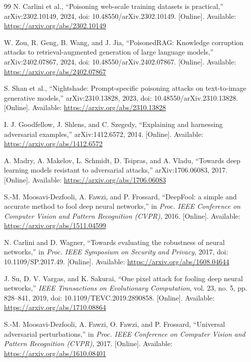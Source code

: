 \documentclass[conference]{IEEEtran}
\begin{document}
\begin{thebibliography}{99}
N. Carlini et al., ``Poisoning web-scale training datasets is practical,'' arXiv:2302.10149, 2024, doi: 10.48550/arXiv.2302.10149. [Online]. Available: \url{https://arxiv.org/abs/2302.10149}

W. Zou, R. Geng, B. Wang, and J. Jia, ``PoisonedRAG: Knowledge corruption attacks to retrieval-augmented generation of large language models,'' arXiv:2402.07867, 2024, doi: 10.48550/arXiv.2402.07867. [Online]. Available: \url{https://arxiv.org/abs/2402.07867}

S. Shan et al., ``Nightshade: Prompt-specific poisoning attacks on text-to-image generative models,'' arXiv:2310.13828, 2023, doi: 10.48550/arXiv.2310.13828. [Online]. Available: \url{https://arxiv.org/abs/2310.13828}

I. J. Goodfellow, J. Shlens, and C. Szegedy, ``Explaining and harnessing adversarial examples,'' arXiv:1412.6572, 2014. [Online]. Available: \url{https://arxiv.org/abs/1412.6572}

A. Madry, A. Makelov, L. Schmidt, D. Tsipras, and A. Vladu, ``Towards deep learning models resistant to adversarial attacks,'' arXiv:1706.06083, 2017. [Online]. Available: \url{https://arxiv.org/abs/1706.06083}

S.-M. Moosavi-Dezfooli, A. Fawzi, and P. Frossard, ``DeepFool: a simple and accurate method to fool deep neural networks,'' in \emph{Proc. IEEE Conference on Computer Vision and Pattern Recognition (CVPR)}, 2016. [Online]. Available: \url{https://arxiv.org/abs/1511.04599}

N. Carlini and D. Wagner, ``Towards evaluating the robustness of neural networks,'' in \emph{Proc. IEEE Symposium on Security and Privacy}, 2017, doi: 10.1109/SP.2017.49. [Online]. Available: \url{https://arxiv.org/abs/1608.04644}

J. Su, D. V. Vargas, and K. Sakurai, ``One pixel attack for fooling deep neural networks,'' \emph{IEEE Transactions on Evolutionary Computation}, vol. 23, no. 5, pp. 828--841, 2019, doi: 10.1109/TEVC.2019.2890858. [Online]. Available: \url{https://arxiv.org/abs/1710.08864}

S.-M. Moosavi-Dezfooli, A. Fawzi, O. Fawzi, and P. Frossard, ``Universal adversarial perturbations,'' in \emph{Proc. IEEE Conference on Computer Vision and Pattern Recognition (CVPR)}, 2017. [Online]. Available: \url{https://arxiv.org/abs/1610.08401}


\end{thebibliography}
\end{document}
